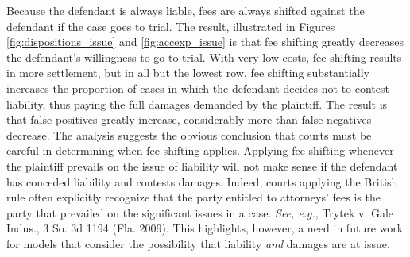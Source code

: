 \documentclass{article}
\begin{document}
Because the defendant is always liable, fees are always shifted against the defendant if the case goes to trial. The result, illustrated in Figures \ref{fig:dispositions_issue} and \ref{fig:accexp_issue} is that fee shifting greatly decreases the defendant's willingness to go to trial. With very low costs, fee shifting results in more settlement, but in all but the lowest row, fee shifting substantially increases the proportion of cases in which the defendant decides not to contest liability, thus paying the full damages demanded by the plaintiff. The result is that false positives greatly increase, considerably more than false negatives decrease. The analysis suggests the obvious conclusion that courts must be careful in determining when fee shifting applies. Applying fee shifting whenever the plaintiff prevails on the issue of liability will not make sense if the defendant has conceded liability and contests damages. Indeed, courts applying the British rule often explicitly recognize that the party entitled to attorneys' fees is the party that prevailed on the significant issues in a case. \textit{See, e.g.}, Trytek v. Gale Indus., 3 So. 3d 1194 (Fla. 2009). This highlights, however, a need in future work for models that consider the possibility that liability \textit{and} damages are at issue. 
\end{document}
